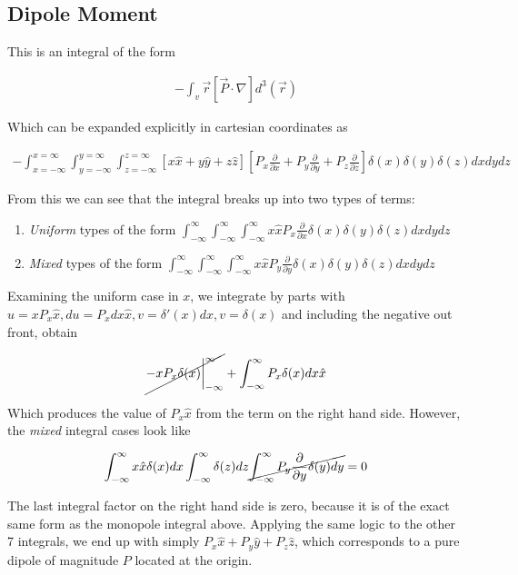 \documentclass[paper=a4, fontsize=11pt]{scrartcl} %
\newcommand{\partd}[2]{\frac{\partial #1}{\partial #2}}
\numberwithin{equation}{section} %
\numberwithin{figure}{section} %
\numberwithin{table}{section} %
\begin{document}
\subsection{Dipole Moment}

This is an integral of the form

\begin{align}
-\int_v \vec{r}\left[\vec{P} \cdot \nabla\right] d^3(\vec{r})
\end{align}

Which can be expanded explicitly in cartesian coordinates as

\begin{align}
-\int_{x=-\infty}^{x=\infty} \int_{y=-\infty}^{y=\infty} \int_{z=-\infty}^{z=\infty}\left[x\hat{x} +y\hat{y} + z\hat{z}\right]\left[P_x\partd{}{x} + P_y\partd{}{y} + P_z\partd{}{z}\right]\delta(x)\delta(y)\delta(z)dxdydz
\end{align}

From this we can see that the integral breaks up into two types of terms:

\begin{enumerate}
\item \textit{Uniform} types of the form $\int_{-\infty}^{\infty}\int_{-\infty}^{\infty}\int_{-\infty}^{\infty}x\hat{x}P_x\partd{}{x}\delta(x)\delta(y)\delta(z) dxdydz$
\item \textit{Mixed} types of the form $\int_{-\infty}^{\infty}\int_{-\infty}^{\infty}\int_{-\infty}^{\infty}x\hat{x}P_y\partd{}{y}\delta(x)\delta(y)\delta(z)dxdydz$ 
\end{enumerate}

Examining the uniform case in $x$, we integrate by parts with $u=xP_x \hat{x}, du=P_xdx\hat{x}, v=\delta'(x)dx, v = \delta(x)$ and including the negative out front, obtain

\begin{align}
\cancel{-xP_x\delta(x)\bigg|_{-\infty}^{\infty}} + \int_{-\infty}^{\infty}P_x\delta(x)dx\hat{x}
\end{align}

Which produces the value of $P_x\hat{x}$ from the term on the right hand side. However, the \textit{mixed} integral cases look like

\begin{align}
\int_{-\infty}^{\infty}x\hat{x}\delta(x)dx\int_{-\infty}^{\infty}\delta(z)dz\cancel{\int_{-\infty}^{\infty}P_y\partd{}{y}\delta(y)dy} = 0
\end{align} 

The last integral factor on the right hand side is zero, because it is of the exact same form as the monopole integral above. Applying the same logic to the other 7 integrals, we end up with simply $P_x \hat{x} + P_y \hat{y} + P_z\hat{z}$, which corresponds to a pure dipole of magnitude $P$ located at the origin.
\end{document}

